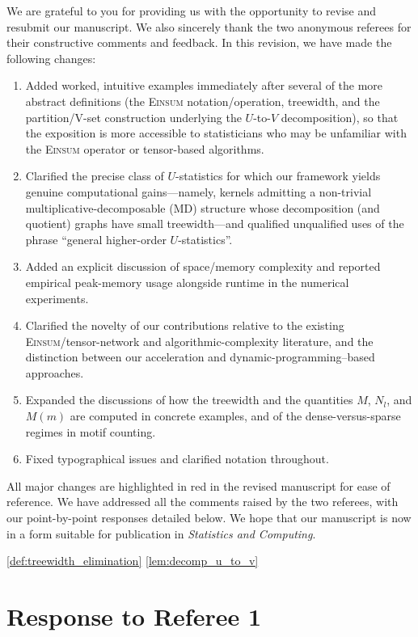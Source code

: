 \documentclass[12pt]{article}
\newcommand{\Einsum}{\textsc{Einsum}}
\begin{document}
We are grateful to you for providing us with the opportunity to revise and resubmit our manuscript. We also sincerely thank the two anonymous referees for their constructive comments and feedback. In this revision, we have made the following changes:
\begin{enumerate}
\item Added worked, intuitive examples immediately after several of the more abstract definitions (the \Einsum{} notation/operation, treewidth, and the partition/V-set construction underlying the $U$-to-$V$ decomposition), so that the exposition is more accessible to statisticians who may be unfamiliar with the \Einsum{} operator or tensor-based algorithms.
\item Clarified the precise class of $U$-statistics for which our framework yields genuine computational gains---namely, kernels admitting a non-trivial multiplicative-decomposable (MD) structure whose decomposition (and quotient) graphs have small treewidth---and qualified unqualified uses of the phrase ``general higher-order $U$-statistics''.
\item Added an explicit discussion of space/memory complexity and reported empirical peak-memory usage alongside runtime in the numerical experiments.
\item Clarified the novelty of our contributions relative to the existing \Einsum{}/tensor-network and algorithmic-complexity literature, and the distinction between our acceleration and dynamic-programming--based approaches.
\item Expanded the discussions of how the treewidth and the quantities $M$, $N_l$, and $M(m)$ are computed in concrete examples, and of the dense-versus-sparse regimes in motif counting.
\item Fixed typographical issues and clarified notation throughout.
\end{enumerate}
All major changes are highlighted in {\color{red}red} in the revised manuscript for ease of reference. We have addressed all the comments raised by the two referees, with our point-by-point responses detailed below. We hope that our manuscript is now in a form suitable for publication in \emph{Statistics and Computing}.

\ref{def:treewidth_elimination}
\ref{lem:decomp_u_to_v}
\newpage

\section*{Response to Referee 1}
\end{document}
